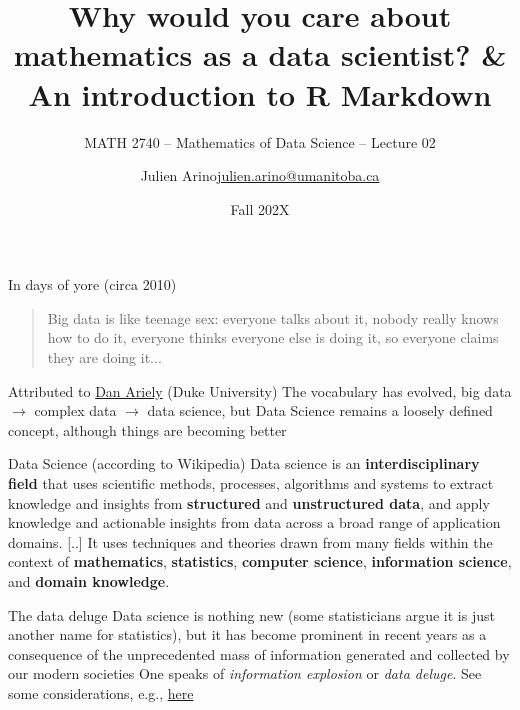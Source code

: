 \documentclass[aspectratio=169]{beamer}\usepackage[]{graphicx}\usepackage[]{xcolor}
\subtitle{MATH 2740 -- Mathematics of Data Science -- Lecture 02}
\author{\texorpdfstring{Julien Arino\newline\url{julien.arino@umanitoba.ca}}{Julien Arino}}
\institute{Department of Mathematics @ University of Manitoba}
\date{Fall 202X}
\title{Why would you care about mathematics as a data scientist? \& An introduction to R Markdown}
\begin{document}



\begin{frame}{In days of yore (circa 2010)}
\begin{quote}
Big data is like teenage sex: everyone talks about it, nobody really knows how to do it, everyone thinks everyone else is doing it, so everyone claims they are doing it...
\end{quote}

Attributed to \href{https://twitter.com/danariely/status/287952257926971392?lang=en}{Dan Ariely} (Duke University)
\vfill
The vocabulary has evolved, big data $\to$ complex data $\to$ data science, but Data Science remains a loosely defined concept, although things are becoming better
\end{frame}

\begin{frame}{Data Science (according to Wikipedia)}
Data science is an \textbf{interdisciplinary field} that uses scientific methods, processes, algorithms and systems to extract knowledge and insights from \textbf{structured} and \textbf{unstructured data}, and apply knowledge and actionable insights from data across a broad range of application domains.
\vfill
[..] It uses techniques and theories drawn from many fields within the context of \textbf{mathematics}, \textbf{statistics}, \textbf{computer science}, \textbf{information science}, and \textbf{domain knowledge}.
\end{frame}

\begin{frame}{The data deluge}
\bbullet Data science is nothing new (some statisticians argue it is just another name for statistics), but it has become prominent in recent years as a consequence of the unprecedented mass of information generated and collected by our modern societies
\vfill
\bbullet One speaks of \textit{information explosion} or \textit{data deluge}. See some considerations, e.g., \href{https://bernardmarr.com/how-much-data-is-there-in-the-world/}{here}
\end{frame}
\end{document}
